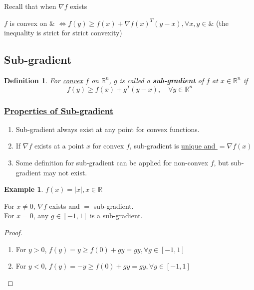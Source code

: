 \documentclass[11pt,a4paper]{article}
\newtheorem{example}{Example}
\newtheorem{definition}{Definition}
\begin{document}
Recall that when $\nabla f$ exists

$f$ is convex on $\&$ $\Leftrightarrow f(y)\geq f(x)+\nabla f(x)^T(y-x),\forall x,y\in\&$ (the inequality is strict for strict convexity)
\subsection{Sub-gradient}
\begin{definition}
    For \underline{convex} $f$ on $\mathbb{R}^n$, $g$ is called a \textbf{sub-gradient} of $f$ at $x\in \mathbb{R}^n$ if $$f(y)\geq f(x)+g^T(y-x),\quad \forall y\in \mathbb{R}^n$$
\end{definition}
\subsubsection*{\underline{Properties of Sub-gradient}}
\begin{enumerate}[1)]
    \item Sub-gradient always exist at any point for convex functions.
    \item If $\nabla f$ exists at a point $x$ for convex $f$, sub-gradient is \underline{unique and $=\nabla f(x)$}
    \item Some definition for sub-gradient can be applied for non-convex $f$, but sub-gradient may not exist.
\end{enumerate}

\begin{example}
$f(x)=|x|,x\in \mathbb{R}$
\end{example}
For $x\neq 0$, $\nabla f$ exists and $=$ sub-gradient.\\
For $x=0$, any $g\in[-1,1]$ is a sub-gradient.
\begin{proof}\quad
\begin{enumerate}[(1)]
    \item For $y>0$, $f(y)=y\geq f(0)+gy=gy,\forall g\in[-1,1]$
    \item For $y<0$, $f(y)=-y\geq f(0)+gy=gy,\forall g\in[-1,1]$
\end{enumerate}
\end{proof}
\end{document}
